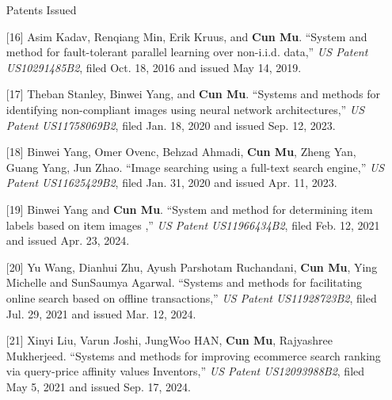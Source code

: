 \documentclass[11pt,a4paper,roman]{moderncv} %
\begin{document}
\begin{enumerate}
\vspace*{3mm}
{\color{color1} Patents Issued}
\vspace*{1mm}
\item[{[16]}] Asim Kadav, Renqiang Min, Erik Kruus, and {\bfseries Cun Mu}. ``System and method for fault-tolerant parallel learning over non-i.i.d. data,'' 
{\em US Patent US10291485B2}, filed Oct. 18, 2016 and issued May 14, 2019.
\item[{[17]}] Theban Stanley, Binwei Yang, and {\bfseries Cun Mu}. ``Systems and methods for identifying non-compliant images using neural network architectures,'' 
{\em US Patent US11758069B2}, filed Jan. 18, 2020 and issued Sep. 12, 2023.
\item[{[18]}] Binwei Yang, Omer Ovenc, Behzad Ahmadi, {\bfseries Cun Mu}, Zheng Yan, Guang Yang, Jun Zhao. ``Image searching using a full-text search engine,'' 
{\em US Patent US11625429B2}, filed Jan. 31, 2020 and issued Apr. 11, 2023.
\item[{[19]}] Binwei Yang and {\bfseries Cun Mu}. 
``System and method for determining item labels based on item images
,'' 
{\em US Patent US11966434B2}, filed Feb. 12, 2021 and issued Apr. 23, 2024.
\item[{[20]}] Yu Wang, Dianhui Zhu, Ayush Parshotam Ruchandani, {\bfseries Cun Mu}, Ying Michelle and SunSaumya Agarwal. ``Systems and methods for facilitating online search based on offline transactions,'' 
{\em US Patent US11928723B2}, filed Jul. 29, 2021 and issued Mar. 12, 2024.
\item[{[21]}] Xinyi Liu, Varun Joshi, JungWoo HAN, {\bfseries Cun Mu}, Rajyashree Mukherjeed. 
``Systems and methods for improving ecommerce search ranking via query-price affinity values Inventors,'' 
{\em US Patent US12093988B2}, filed May 5, 2021 and issued Sep. 17, 2024.
\end{enumerate}
\end{document}

